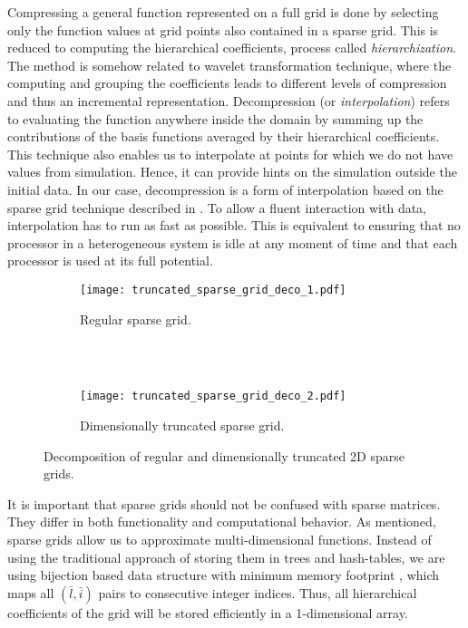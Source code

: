 Compressing a general function represented on a full grid is done by selecting
only the function values at grid points also contained in a sparse grid. This is
reduced to computing the hierarchical coefficients, process called
\textit{hierarchization}. The method is somehow related to wavelet
transformation technique, where the computing and grouping the coefficients
leads to different levels of compression and thus an incremental representation.
Decompression (or \textit{interpolation}) refers to evaluating the function
anywhere inside the domain by summing up the contributions of the basis
functions averaged by their hierarchical coefficients. This technique also
enables us to interpolate at points for which we do not have values from
simulation. Hence, it can provide hints on the simulation outside the initial
data. In our case, decompression is a form of interpolation based on the sparse
grid technique described in \cite{CambridgeJournals:227245}. To allow a fluent
interaction with data, interpolation has to run as fast as possible. This is
equivalent to ensuring that no processor in a heterogeneous system is idle at
any moment of time and that each processor is used at its full potential.

\begin{figure}[t]
  \begin{subfigure}[b]{1\linewidth}
    \centering
    \texttt{[image: truncated\_sparse\_grid\_deco\_1.pdf]}
    \caption{Regular sparse grid.}
  \end{subfigure}
  \\ \\
  \begin{subfigure}[b]{1\linewidth}
    \centering
    \texttt{[image: truncated\_sparse\_grid\_deco\_2.pdf]}
    \caption{Dimensionally truncated sparse grid.}
  \end{subfigure}
  \caption{Decomposition of regular and dimensionally truncated 2D sparse
  grids.}
  \label{fig:truncated_sparse_grid_deco}
\end{figure}

It is important that sparse grids should not be confused with sparse matrices.
They differ in both functionality and computational behavior. As mentioned,
sparse grids allow us to approximate multi-dimensional functions. Instead of
using the traditional approach of storing them in trees and hash-tables, we are
using bijection based data structure with minimum memory footprint
\cite{Murarasu:2011:CDS:1941553.1941559}, which maps all $(\bar{l},\bar{i})$
pairs to consecutive integer indices. Thus, all hierarchical coefficients of the
grid will be stored efficiently in a 1-dimensional array.

